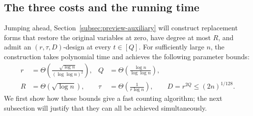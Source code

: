 \documentclass[11pt,reqno]{amsart}
\numberwithin{equation}{section}
\theoremstyle{definition}\newtheorem{definition}[theorem]{Definition}
\theoremstyle{remark}\newtheorem{remark}[theorem]{Remark}
\renewcommand{\le}{\leqslant}
\begin{document}
\subsection{The three costs and the running time}
\label{subsec:preview-parameters}
Jumping ahead, Section~\ref{subsec:preview-auxiliary} will construct
replacement forms that restore the original variables at zero,
have degree at most $R$, and admit an $(r,\tau,D)$-design at every
$t\in[Q]$. For sufficiently large $n$, the construction takes
polynomial time and achieves the following parameter bounds:
\begin{equation}\label{eq:overview-parameter-bounds}
 \begin{aligned}
 r&=\Theta\!\left(\frac{\sqrt{\log n}}{(\log\log n)^2}\right),
 &Q&=\Theta\!\left(\frac{\log n}{\log\log n}\right),\\
 R&=\Theta(\sqrt{\log n}),
 &\tau&=\Theta\!\left(\frac1{r\log n}\right),\qquad
 D=r^{2Q}\le(2n)^{1/128}.
 \end{aligned}
\end{equation}
We first show how these bounds give a fast counting algorithm;
the next subsection will justify that they can all be achieved
simultaneously.
\end{document}
